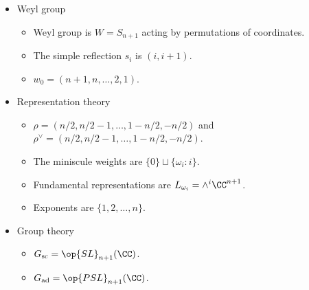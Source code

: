 \documentclass{article}
\begin{document}
\begin{itemize}
\begin{itemize}
		\[\begin{tikzcd}[cramped]
			{\alpha_1} & {\alpha_2} & \cdots & {\alpha_n}
			\arrow[no head, from=1-1, to=1-2]
			\arrow[no head, from=1-2, to=1-3]
			\arrow[no head, from=1-3, to=1-4]
		\end{tikzcd}\]
		\item The fundamental weights are $\{\omega_i\}_i$ where $\omega_i\coloneqq({1,\ldots,1},0,\ldots,0)$ has $i$ ones.
		\item Maximal root $\theta=e_{n+1}-e_n$.
	\end{itemize}
	\item Weyl group
	\begin{itemize}
		\item Weyl group is $W=S_{n+1}$ acting by permutations of coordinates.
		\item The simple reflection $s_i$ is $(i,i+1)$.
		\item $w_0=(n+1,n,\ldots,2,1)$.
	\end{itemize}
	\item Representation theory
	\begin{itemize}
		\item $\rho=(n/2,n/2-1,\ldots,1-n/2,-n/2)$ and $\rho^\lor=(n/2,n/2-1,\ldots,1-n/2,-n/2)$.
		\item The miniscule weights are $\{0\}\sqcup\{\omega_i:i\}$.
		\item Fundamental representations are $L_{\omega_i}=\land^i\CC^{n+1}$.
		\item Exponents are $\{1,2,\ldots,n\}$.
	\end{itemize}
	\item Group theory
	\begin{itemize}
		\item $G_{\mathrm{sc}}=\op{SL}_{n+1}(\CC)$.
		\item $G_{\mathrm{ad}}=\op{PSL}_{n+1}(\CC)$.
	\end{itemize}
\end{itemize}

\newpage
\end{document}
